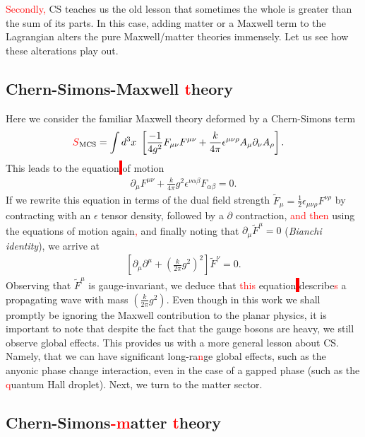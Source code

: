     \textcolor{red}{Secondly,} CS teaches us the old lesson that sometimes the whole is greater than the sum of its parts. In this case, adding matter or a Maxwell term to the Lagrangian alters the pure Maxwell/matter theories immensely. Let us see how these alterations play out.

    \subsection{Chern-Simons-Maxwell \textcolor{red}{t}heory}
    Here we consider the familiar Maxwell theory deformed by a Chern-Simons term
    \begin{align}
        \textcolor{red}{S}_{\text{MCS}} &= \int d^3x \ \left[ \frac{-1}{4 g^2} F_{\mu \nu} F^{\mu \nu} + \frac{k}{4 \pi} \epsilon^{\mu \nu \rho} A_{\mu} \partial_{\nu} A_{\rho} \right].
    \end{align}
    This leads to the equation\colorbox{red}{ } of motion
    \begin{align}
        \partial_{\mu} F^{\mu \nu} + \frac{k}{4\pi} g^2 \epsilon^{\nu \alpha \beta}F_{\alpha \beta} =0.
    \end{align}
    If we rewrite this equation in terms of the dual field strength $\tilde{F}_{\mu} = \frac{1}{2} \epsilon_{\mu\nu\rho} F^{\nu\rho}$ by contracting with an $\epsilon$ tensor density, followed by a $\partial$ contraction, \textcolor{red}{and then} using the equations of motion again\textcolor{red}{,} and finally noting that $\partial_{\mu} \tilde{F}^{\mu} =0$ (\textit{Bianchi identity}), we arrive at 
    \begin{align}
        \left[\partial_{\mu} \partial^{\mu} + \left(\frac{k}{2 \pi} g^2 \right)^2 \right] \tilde{F}^{\nu}=0.
    \end{align}
    Observing that $\tilde{F}^{\mu}$ is gauge-invariant, we deduce that \textcolor{red}{this} equation\colorbox{red}{ } describe\textcolor{red}{s} a propagating wave with mass $\left(\frac{k}{2 \pi} g^2 \right)$.
    Even though in this work we shall promptly be ignoring the Maxwell contribution to the planar physics, it is important to note that despite the fact that the gauge bosons are heavy, we still observe global effects. This provides us with a more general lesson about CS. Namely, that we can have significant long-ra\textcolor{red}{n}ge global effects, such as the anyonic phase change interaction, even in the case of a gapped phase (such as the \textcolor{red}{q}uantum Hall droplet).
    Next, we turn to the matter sector.
    \subsection{Chern-Simons\textcolor{red}{-m}atter \textcolor{red}{t}heory}
    
